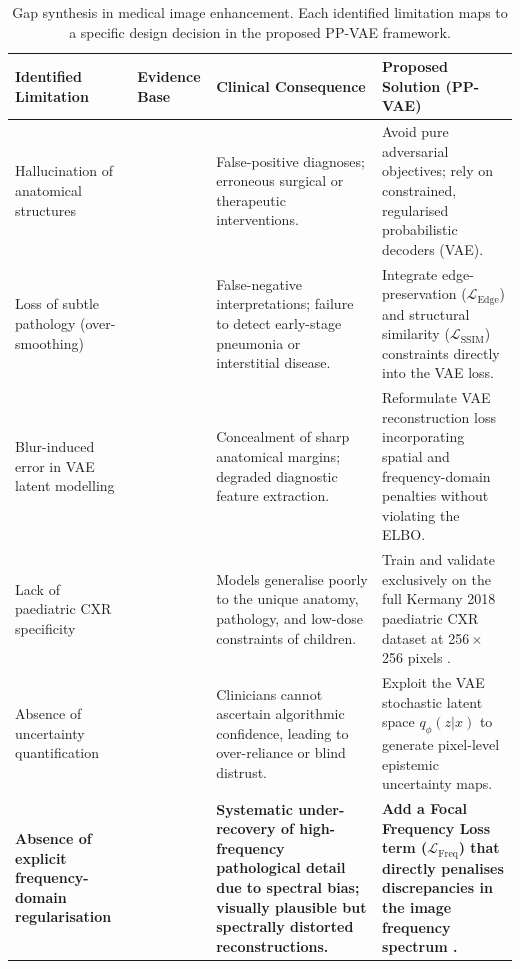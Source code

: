 \documentclass[12pt, a4paper, twoside, openright]{book}
\begin{document}
\begin{table}[htbp]
  \centering
  \caption{Gap synthesis in medical image enhancement. Each identified limitation maps to a
  specific design decision in the proposed PP-VAE framework.}
  \label{tab:intro:gaps}
  \small
  \begin{tabularx}{\textwidth}{
    >{\raggedright\arraybackslash}p{2.8cm} 
    >{\raggedright\arraybackslash}p{2.2cm} 
    >{\raggedright\arraybackslash}X 
    >{\raggedright\arraybackslash}X
  }
    \toprule
    \textbf{Identified Limitation} &
    \textbf{Evidence Base} &
    \textbf{Clinical Consequence} &
    \textbf{Proposed Solution (PP-VAE)} \\
    \midrule
    Hallucination of anatomical structures
    & \cite{bhadra_hallucinations_2021, kc_sfrc_2024}
    & False-positive diagnoses; erroneous surgical or therapeutic interventions.
    & Avoid pure adversarial objectives; rely on constrained, regularised probabilistic decoders (VAE). \\
    \midrule
    Loss of subtle pathology (over-smoothing)
    & \cite{bredell_explicitly_2023, zhao_loss_2017}
    & False-negative interpretations; failure to detect early-stage pneumonia or interstitial disease.
    & Integrate edge-preservation ($\mathcal{L}_\mathrm{Edge}$) and structural similarity ($\mathcal{L}_\mathrm{SSIM}$) constraints directly into the VAE loss. \\
    \midrule
    Blur-induced error in VAE latent modelling
    & \cite{bredell_explicitly_2023}
    & Concealment of sharp anatomical margins; degraded diagnostic feature extraction.
    & Reformulate VAE reconstruction loss incorporating spatial and frequency-domain penalties without violating the ELBO. \\
    \midrule
    Lack of paediatric CXR specificity
    & \cite{kermany_identifying_2018, laborie_scoping_2026, strauss_image_2009}
    & Models generalise poorly to the unique anatomy, pathology, and low-dose constraints of children.
    & Train and validate exclusively on the full Kermany 2018 paediatric CXR dataset at 256\,$\times$\,256 pixels \cite{kermany_identifying_2018}. \\
    \midrule
    Absence of uncertainty quantification
    & \cite{kendall_what_2017, ovadia_can_2019}
    & Clinicians cannot ascertain algorithmic confidence, leading to over-reliance or blind distrust.
    & Exploit the VAE stochastic latent space $q_\phi(z|x)$ to generate pixel-level epistemic uncertainty maps. \\
    \midrule
    \textbf{Absence of explicit frequency-domain regularisation}
    & \textbf{\cite{rahaman_spectral_2019, xu_frequency_2020, durall_watch_2020}}
    & \textbf{Systematic under-recovery of high-frequency pathological detail due to spectral bias; visually plausible but spectrally distorted reconstructions.}
    & \textbf{Add a Focal Frequency Loss term ($\mathcal{L}_\mathrm{Freq}$) that directly penalises discrepancies in the image frequency spectrum \cite{jiang_focal_2021}.} \\
    \bottomrule
  \end{tabularx}
\end{table}
\end{document}
